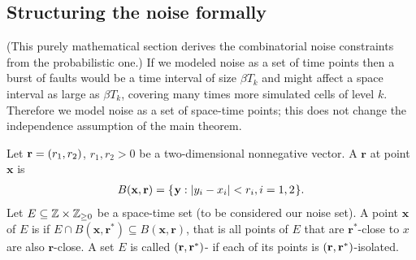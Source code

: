 \documentclass[11pt]{memoir}
\theoremstyle{definition} %
\renewcommand{\le}{\leq}
\renewcommand{\ge}{\geq}
\renewcommand{\vek}[1]{\mathbf{#1}}
\newcommand{\Tu}{T}
\renewcommand{\r}{\vek{r}} %
\newcommand{\x}{\vek{x}} %
\newcommand{\y}{\vek{y}} %
\begin{document}



\subsection{Structuring the noise formally}\label{sec:sparsity}

(This purely mathematical section derives the combinatorial noise
constraints from the probabilistic one.)
If we modeled noise as a set of time points then a burst of faults would be a time
interval of size \( \beta\Tu_{k} \) and might affect a space interval as large as \( \beta\Tu_{k} \),
covering many times more simulated cells of level \( k \).
Therefore we model noise as a set of space-time points; this does not change the independence
assumption of the main theorem.

\begin{definition}\label{def:isolation}
Let \( \r=\pair{r_{1}}{r_{2}} \), \( r_{1}, r_{2}> 0 \)
be a two-dimensional nonnegative vector.
A  \( \r  \)  at point  \( \x \) is
\begin{align}\label{eq:ball1}
  B(\x,\r) = \setOf{\y}{\abs{y_{i} - x_{i}} < r_{i}, i=1,2}.
\end{align}  
Let \( E\subseteq \bbZ\times\bbZ_{\ge 0} \) be a space-time set (to be considered our noise set).
A point \( \x \) of \( E \) is \df{\( \pair{\r}{\r^{*}} \)-isolated} if
\(  E \cap B(\x,\r^{*})\subseteq B(\x, \r)  \),
that is all points of \( E \) that are \( \r^{*} \)-close to \( x \) are also \( \r \)-close.
A set \( E \) is called \( \pair{\r}{\r^{*}} \)- if each of its points is \( \pair{\r}{\r^{*}} \)-isolated.
\end{definition}
\end{document}

